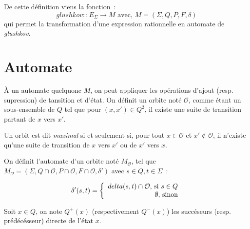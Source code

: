 \documentclass{article}
\begin{document}
De cette définition viens la fonction~:
\[
  glushkov :: E_{\Sigma} \to M \text{ avec, } M = (\Sigma, Q, P, F, \delta)
\]
qui permet la transformation d'une expression rationnelle en automate de 
\textit{glushkov}.


\section{Automate}

À un automate quelquonc \(M\), on peut appliquer les opérations d'ajout (resp. 
supression) de tansition et d'état. On définit un orbite noté \(\mathcal{O}\), 
comme étant un sous-ensemble de \(Q\) tel que pour \((x, x') \in Q^2\), il 
existe une suite de transition partant de \(x\) vers \(x'\).

Un orbit est dit \textit{maximal} si et seulement si, pour tout 
\(x \in \mathcal{O}\) et \(x' \notin \mathcal{O}\), il n'existe qu'une suite de 
transition de \(x\) vers \(x'\) ou de \(x'\) vers \(x\).

On définit l'automate d'un orbite noté \(M_{\mathcal{O}}\), tel que 
\(M_{\mathcal{O}} = (\Sigma, Q \cap \mathcal{O}, P \cap \mathcal{O}, F \cap \mathcal{O}, 
\delta')\) avec \(s \in Q, t \in \Sigma\)~:

\[
  \delta'(s, t) =    \left \{
    \begin{array}{r c l}
      delta(s, t) \cap \mathcal{O} \text{, si } s \in Q \\ 
      \emptyset \text{, sinon} \\
    \end{array}
    \right .
\]

Soit \(x \in Q\), on note \(Q^{+}(x)\) (respectivement \(Q^{-}(x)\)) les 
succéseurs (resp. prédécésseur) directe de l'état \(x\). 
\end{document}
